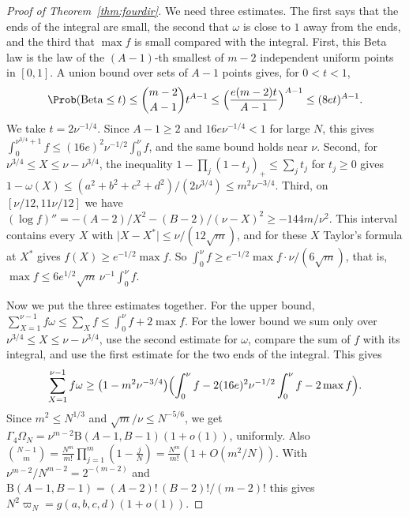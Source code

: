 \begin{proof}[Proof of Theorem~\ref{thm:fourdir}]
We need three estimates. The first says that the ends of the integral are small, the second that
$\omega$ is close to $1$ away from the ends, and the third that $\max f$ is small compared with the
integral. First, this Beta law is the law of the $(A-1)$-th smallest of $m-2$
independent uniform points in $[0,1]$. A union bound over sets of $A-1$ points gives, for $0<t<1$,
\[
 \Prob(\mathrm{Beta}\le t)\le\binom{m-2}{A-1}t^{A-1}\le\Bigl(\frac{e(m-2)t}{A-1}\Bigr)^{A-1}
 \le(8et)^{A-1}.
\]
We take $t=2\nu^{-1/4}$. Since $A-1\ge2$ and $16e\nu^{-1/4}<1$ for large $N$, this gives
$\int_0^{\nu^{3/4}+1}f\le(16e)^2\nu^{-1/2}\int_0^\nu f$, and the same bound holds near $\nu$. Second,
for $\nu^{3/4}\le X\le\nu-\nu^{3/4}$, the inequality $1-\prod_j(1-t_j)_+\le\sum_jt_j$ for $t_j\ge0$
gives $1-\omega(X)\le(a^2+b^2+c^2+d^2)/(2\nu^{3/4})\le m^2\nu^{-3/4}$. Third, on
$[\nu/12,11\nu/12]$ we have
$(\log f)''=-(A-2)/X^2-(B-2)/(\nu-X)^2\ge-144m/\nu^2$. This interval contains every $X$ with
$\lvert X-X^*\rvert\le\nu/(12\sqrt m)$, and for these $X$ Taylor's formula at $X^*$ gives
$f(X)\ge e^{-1/2}\max f$. So $\int_0^\nu f\ge e^{-1/2}\max f\cdot\nu/(6\sqrt m)$, that is,
$\max f\le6e^{1/2}\sqrt m\,\nu^{-1}\int_0^\nu f$.

Now we put the three estimates together. For the upper bound,
$\sum_{X=1}^{\nu-1}f\omega\le\sum_Xf\le\int_0^\nu f+2\max f$. For the lower bound we sum only over
$\nu^{3/4}\le X\le\nu-\nu^{3/4}$, use the second estimate for $\omega$, compare the sum of $f$ with
its integral, and use the first estimate for the two ends of the integral. This gives
\[
 \sum_{X=1}^{\nu-1}f\omega\ge\bigl(1-m^2\nu^{-3/4}\bigr)
 \Bigl(\int_0^\nu f-2(16e)^2\nu^{-1/2}\int_0^\nu f-2\max f\Bigr).
\]
Since $m^2\le N^{1/3}$ and $\sqrt m/\nu\le N^{-5/6}$, we get
$\Gamma_4\Omega_N=\nu^{m-2}\mathrm B(A-1,B-1)(1+o(1))$, uniformly. Also
$\binom{N-1}m=\frac{N^m}{m!}\prod_{j=1}^m(1-\frac jN)=\frac{N^m}{m!}(1+O(m^2/N))$. With
$\nu^{m-2}/N^{m-2}=2^{-(m-2)}$ and $\mathrm B(A-1,B-1)=(A-2)!\,(B-2)!/(m-2)!$ this gives
$N^2\varpi_N=g(a,b,c,d)(1+o(1))$.


\end{proof}
